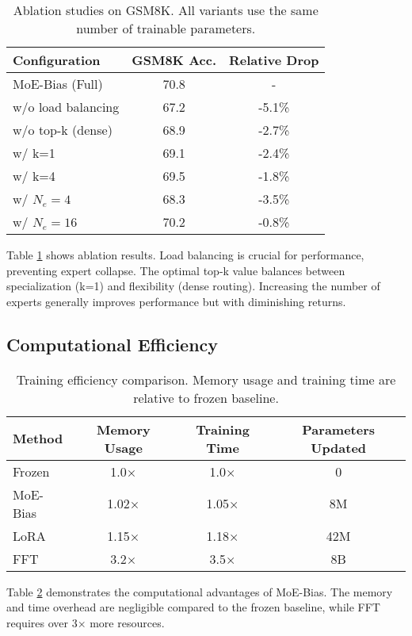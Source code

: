 \documentclass{article}
\begin{document}
\begin{table}[t]
\centering
\caption{Ablation studies on GSM8K. All variants use the same number of trainable parameters.}
\label{tab:ablation}
\begin{tabular}{lcc}
\toprule
Configuration & GSM8K Acc. & Relative Drop \\
\midrule
MoE-Bias (Full) & 70.8 & - \\
\quad w/o load balancing & 67.2 & -5.1\% \\
\quad w/o top-k (dense) & 68.9 & -2.7\% \\
\quad w/ k=1 & 69.1 & -2.4\% \\
\quad w/ k=4 & 69.5 & -1.8\% \\
\quad w/ $N_e=4$ & 68.3 & -3.5\% \\
\quad w/ $N_e=16$ & 70.2 & -0.8\% \\
\bottomrule
\end{tabular}
\end{table}

Table \ref{tab:ablation} shows ablation results. Load balancing is crucial for performance, preventing expert collapse. The optimal top-k value balances between specialization (k=1) and flexibility (dense routing). Increasing the number of experts generally improves performance but with diminishing returns.

\subsection{Computational Efficiency}

\begin{table}[t]
\centering
\caption{Training efficiency comparison. Memory usage and training time are relative to frozen baseline.}
\label{tab:efficiency}
\begin{tabular}{lccc}
\toprule
Method & Memory Usage & Training Time & Parameters Updated \\
\midrule
Frozen & 1.0× & 1.0× & 0 \\
MoE-Bias & 1.02× & 1.05× & 8M \\
LoRA & 1.15× & 1.18× & 42M \\
FFT & 3.2× & 3.5× & 8B \\
\bottomrule
\end{tabular}
\end{table}

Table \ref{tab:efficiency} demonstrates the computational advantages of MoE-Bias. The memory and time overhead are negligible compared to the frozen baseline, while FFT requires over 3× more resources.
\end{document}
